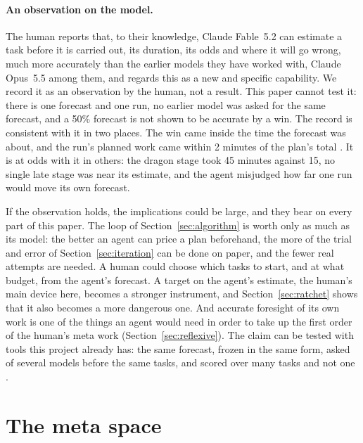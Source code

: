 \documentclass[11pt,a4paper]{article}
\begin{document}
\paragraph{An observation on the model.} The human reports that, to their knowledge, Claude Fable~5.2 can estimate a task before it is carried out, its duration, its odds and where it will go wrong, much more accurately than the earlier models they have worked with, Claude Opus~5.5 among them, and regards this as a new and specific capability. We record it as an observation by the human, not a result. This paper cannot test it: there is one forecast and one run, no earlier model was asked for the same forecast, and a 50\% forecast is not shown to be accurate by a win. The record is consistent with it in two places. The win came inside the time the forecast was about, and the run's planned work came within 2 minutes of the plan's total \citep{batsuk2026fifth}. It is at odds with it in others: the dragon stage took 45 minutes against 15, no single late stage was near its estimate, and the agent misjudged how far one run would move its own forecast.

If the observation holds, the implications could be large, and they bear on every part of this paper. The loop of Section~\ref{sec:algorithm} is worth only as much as its model: the better an agent can price a plan beforehand, the more of the trial and error of Section~\ref{sec:iteration} can be done on paper, and the fewer real attempts are needed. A human could choose which tasks to start, and at what budget, from the agent's forecast. A target on the agent's estimate, the human's main device here, becomes a stronger instrument, and Section~\ref{sec:ratchet} shows that it also becomes a more dangerous one. And accurate foresight of its own work is one of the things an agent would need in order to take up the first order of the human's meta work (Section~\ref{sec:reflexive}). The claim can be tested with tools this project already has: the same forecast, frozen in the same form, asked of several models before the same tasks, and scored over many tasks and not one \citep{brier1950}.

\section{The meta space}
\label{sec:meta}
\end{document}
